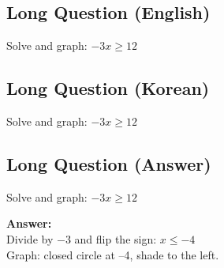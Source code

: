 \cleardoublepage
\subsection*{Long Question (English)}
Solve and graph: $-3x \geq 12$


\newpage
\subsection*{Long Question (Korean)}
Solve and graph: $-3x \geq 12$


\newpage
\subsection*{Long Question (Answer)}
Solve and graph: $-3x \geq 12$

\textbf{Answer:}\\
Divide by $-3$ and flip the sign: $x \leq -4$\\
Graph: closed circle at –4, shade to the left.
